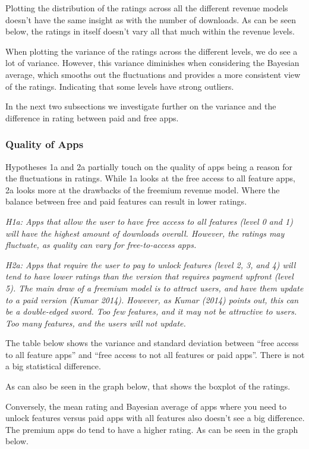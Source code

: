 \documentclass[
  12pt,
  a4paper,
]{article}
\begin{document}
Plotting the distribution of the ratings across all the different
revenue models doesn't have the same insight as with the number of
downloads. As can be seen below, the ratings in itself doesn't vary all
that much within the revenue levels.

When plotting the variance of the ratings across the different levels,
we do see a lot of variance. However, this variance diminishes when
considering the Bayesian average, which smooths out the fluctuations and
provides a more consistent view of the ratings. Indicating that some
levels have strong outliers.

In the next two subsections we investigate further on the variance and
the difference in rating between paid and free apps.

\subsubsection{Quality of Apps}\label{quality-of-apps}

Hypotheses 1a and 2a partially touch on the quality of apps being a
reason for the fluctuations in ratings. While 1a looks at the free
access to all feature apps, 2a looks more at the drawbacks of the
freemium revenue model. Where the balance between free and paid features
can result in lower ratings.

\emph{H1a: Apps that allow the user to have free access to all features
(level 0 and 1) will have the highest amount of downloads overall.
However, the ratings may fluctuate, as quality can vary for
free-to-access apps.}

\emph{H2a: Apps that require the user to pay to unlock features (level
2, 3, and 4) will tend to have lower ratings than the version that
requires payment upfront (level 5). The main draw of a freemium model is
to attract users, and have them update to a paid version (Kumar 2014).
However, as Kumar (2014) points out, this can be a double-edged sword.
Too few features, and it may not be attractive to users. Too many
features, and the users will not update.}

The table below shows the variance and standard deviation between ``free
access to all feature apps'' and ``free access to not all features or
paid apps''. There is not a big statistical difference.

As can also be seen in the graph below, that shows the boxplot of the
ratings.

Conversely, the mean rating and Bayesian average of apps where you need
to unlock features versus paid apps with all features also doesn't see a
big difference. The premium apps do tend to have a higher rating. As can
be seen in the graph below.
\end{document}
